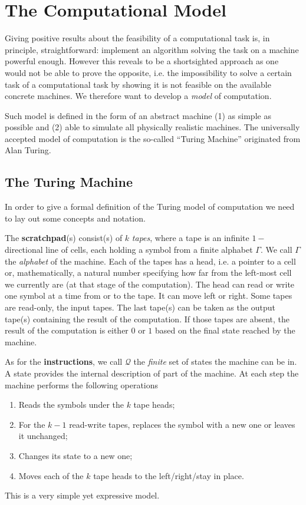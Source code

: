 \chapter{The Computational Model}\label{ch:computational-model}

Giving positive results about the feasibility of a computational task is, in principle, straightforward: implement an algorithm solving the task on a machine powerful enough. However this reveals to be a shortsighted approach as one would not be able to prove the opposite, i.e. the impossibility to solve a certain task of a computational task by showing it is not feasible on the available concrete machines. We therefore want to develop a \emph{model} of computation.

Such model is defined in the form of an abstract machine (1) as simple as possible and (2) able to simulate all physically realistic machines.
The universally accepted model of computation is the so-called ``Turing Machine'' originated from Alan Turing.

\section{The Turing Machine}\label{sec:turing-machine}

In order to give a formal definition of the Turing model of computation we need to lay out some concepts and notation.

The \textbf{scratchpad}(s) consist(s) of $k$ \emph{tapes}, where a tape is an infinite $1-$directional line of cells, each holding a symbol from a finite alphabet $\Gamma$. We call $\Gamma$ the \emph{alphabet} of the machine. Each of the tapes has a head, i.e. a pointer to a cell or, mathematically, a natural number specifying how far from the left-most cell we currently are (at that stage of the computation).
The head can read or write one symbol at a time from or to the tape. It can move left or right.
Some tapes are read-only, the input tapes. The last tape(s) can be taken as the output tape(s) containing the result of the computation.
If those tapes are absent, the result of the computation is either $0$ or $1$ based on the final state reached by the machine.

As for the \textbf{instructions}, we call $\mathcal{Q}$ the \emph{finite} set of states the machine can be in.
A state provides the internal description of part of the machine.
At each step the machine performs the following operations
\begin{enumerate}
	\item Reads the symbols under the $k$ tape heads;
	\item For the $k-1$ read-write tapes, replaces the symbol with a new one or leaves it unchanged;
	\item Changes its state to a new one;
	\item Moves each of the $k$ tape heads to the left/right/stay in place.
\end{enumerate}
This is a very simple yet expressive model.

